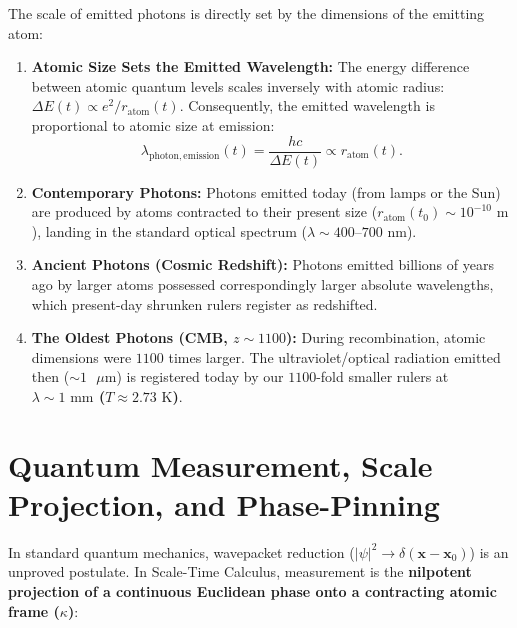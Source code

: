\documentclass[11pt,a4paper]{article}
\begin{document}
The scale of emitted photons is directly set by the dimensions of the emitting atom:
\begin{enumerate}
    \item \textbf{Atomic Size Sets the Emitted Wavelength:} The energy difference between atomic quantum levels scales inversely with atomic radius: $\Delta E(t) \propto e^2 / r_{\mathrm{atom}}(t)$. Consequently, the emitted wavelength is proportional to atomic size at emission:
          \begin{equation}
              \lambda_{\mathrm{photon, emission}}(t) = \frac{h c}{\Delta E(t)} \propto r_{\mathrm{atom}}(t).
          \end{equation}
    \item \textbf{Contemporary Photons:} Photons emitted today (from lamps or the Sun) are produced by atoms contracted to their present size ($r_{\mathrm{atom}}(t_0) \sim 10^{-10}\text{ m}$), landing in the standard optical spectrum ($\lambda \sim 400\text{--}700\text{ nm}$).
    \item \textbf{Ancient Photons (Cosmic Redshift):} Photons emitted billions of years ago by larger atoms possessed correspondingly larger absolute wavelengths, which present-day shrunken rulers register as redshifted.
    \item \textbf{The Oldest Photons (CMB, $z \sim 1100$):} During recombination, atomic dimensions were $1100$ times larger. The ultraviolet/optical radiation emitted then ($\sim 1\text{ }\mu\mathrm{m}$) is registered today by our $1100$-fold smaller rulers at \textbf{$\lambda \sim 1\text{ mm}$ ($T \approx 2.73\text{ K}$)}.
\end{enumerate}

\section{Quantum Measurement, Scale Projection, and Phase-Pinning}
\label{sec:kuantum_olcum_em}

In standard quantum mechanics, wavepacket reduction ($|\psi|^2 \to \delta(\mathbf{x}-\mathbf{x}_0)$) is an unproved postulate. In Scale-Time Calculus, measurement is the \textbf{nilpotent projection of a continuous Euclidean phase onto a contracting atomic frame ($\kappa$)}:
\end{document}
